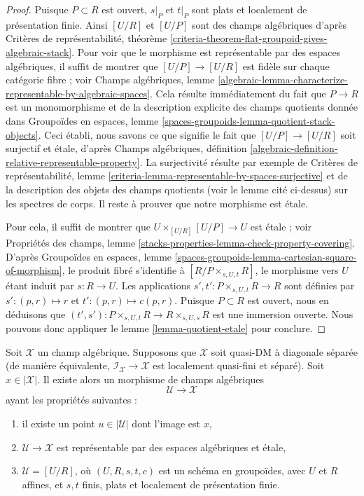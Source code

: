 \begin{proof}
Puisque $P \subset R$ est ouvert, $s|_P$ et $t|_P$
sont plats et localement de pr\'esentation finie.
Ainsi $[U/R]$ et $[U/P]$ sont des champs alg\'ebriques d'apr\`es
Crit\`eres de repr\'esentabilit\'e, th\'eor\`eme
\ref{criteria-theorem-flat-groupoid-gives-algebraic-stack}.
Pour voir que le morphisme est repr\'esentable par des espaces alg\'ebriques,
il suffit de montrer que $[U/P] \to [U/R]$ est fid\`ele sur
chaque cat\'egorie fibre ; voir
Champs alg\'ebriques, lemme
\ref{algebraic-lemma-characterize-representable-by-algebraic-spaces}.
Cela r\'esulte imm\'ediatement du fait que $P \to R$ est un monomorphisme
et de la description explicite des champs quotients donn\'ee dans
Groupo\"ides en espaces, lemme
\ref{spaces-groupoids-lemma-quotient-stack-objects}.
Ceci \'etabli, nous savons ce que signifie le fait que
$[U/P] \to [U/R]$ soit surjectif et \'etale, d'apr\`es
Champs alg\'ebriques, d\'efinition
\ref{algebraic-definition-relative-representable-property}.
La surjectivit\'e r\'esulte par exemple de
Crit\`eres de repr\'esentabilit\'e,
lemme \ref{criteria-lemma-representable-by-spaces-surjective}
et de la description des objets des champs quotients
(voir le lemme cit\'e ci-dessus) sur les spectres de corps.
Il reste \`a prouver que notre morphisme est \'etale.

\medskip\noindent
Pour cela, il suffit de montrer que $U \times_{[U/R]} [U/P] \to U$
est \'etale ; voir Propri\'et\'es des champs, lemme
\ref{stacks-properties-lemma-check-property-covering}.
D'apr\`es Groupo\"ides en espaces, lemme
\ref{spaces-groupoids-lemma-cartesian-square-of-morphism},
le produit fibr\'e s'identifie \`a $[R/P \times_{s, U, t} R]$,
le morphisme vers $U$ \'etant induit par $s : R \to U$.
Les applications $s', t' : P \times_{s, U, t} R \to R$ sont d\'efinies par
$s' : (p, r) \mapsto r$ et $t' : (p, r) \mapsto c(p, r)$. Puisque
$P \subset R$ est ouvert, nous en d\'eduisons que
$(t', s') : P \times_{s, U, t} R \to R \times_{s, U, s} R$
est une immersion ouverte.
Nous pouvons donc appliquer le lemme \ref{lemma-quotient-etale}
pour conclure.
\end{proof}

\begin{lemma}
\label{lemma-etale-local-quasi-DM}
Soit $\mathcal{X}$ un champ alg\'ebrique. Supposons que $\mathcal{X}$ soit
quasi-DM \`a diagonale s\'epar\'ee (de mani\`ere \'equivalente,
$\mathcal{I}_\mathcal{X} \to \mathcal{X}$ est localement quasi-fini et
s\'epar\'e). Soit $x \in |\mathcal{X}|$. Il existe alors un
morphisme de champs alg\'ebriques
$$
\mathcal{U} \longrightarrow \mathcal{X}
$$
ayant les propri\'et\'es suivantes :
\begin{enumerate}
\item il existe un point $u \in |\mathcal{U}|$ dont l'image est $x$,
\item $\mathcal{U} \to \mathcal{X}$ est repr\'esentable par des espaces alg\'ebriques et
\'etale,
\item $\mathcal{U} = [U/R]$, o\`u $(U, R, s, t, c)$ est un sch\'ema
en groupo\"ides, avec $U$ et $R$ affines, et $s, t$ finis, plats et
localement de pr\'esentation finie.
\end{enumerate}
\end{lemma}

